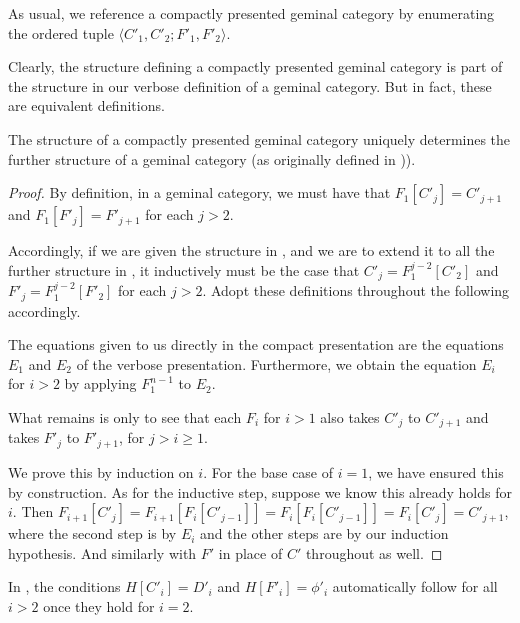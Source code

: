 As usual, we reference a compactly presented geminal category by enumerating the ordered tuple $\langle C'_1, C'_2; F'_1, F'_2 \rangle$.

Clearly, the structure defining a compactly presented geminal category is part of the structure in our verbose definition of a geminal category. But in fact, these are equivalent definitions.

\begin{theorem}\label{GeminalCompactIsVerbose}
The structure of a compactly presented geminal category uniquely determines the further structure of a geminal category (as originally defined in )).
\end{theorem}
\begin{proof}
By definition, in a geminal category, we must have that $F_1[C'_j] = C'_{j + 1}$ and $F_1[F'_j] = F'_{j + 1}$ for each $j > 2$.

Accordingly, if we are given the structure in , and we are to extend it to all the further structure in , it inductively must be the case that $C'_j = F_1^{j - 2}[C'_2]$ and $F'_j = F_1^{j - 2}[F'_2]$ for each $j > 2$. Adopt these definitions throughout the following accordingly.

The equations given to us directly in the compact presentation are the equations $E_1$ and $E_2$ of the verbose presentation. Furthermore, we obtain the equation $E_i$ for $i > 2$ by applying $F_1^{n - 1}$ to $E_2$.

What remains is only to see that each $F_i$ for $i > 1$ also takes $C'_j$ to $C'_{j + 1}$ and takes $F'_j$ to $F'_{j + 1}$, for $j > i \geq 1$.

We prove this by induction on $i$. For the base case of $i = 1$, we have ensured this by construction. As for the inductive step, suppose we know this already holds for $i$. Then $F_{i + 1}[C'_j] = F_{i + 1} [F_i [C'_{j - 1}]] = F_i [F_i [C'_{j - 1}]] = F_i [C'_j] = C'_{j + 1}$, where the second step is by $E_i$ and the other steps are by our induction hypothesis. And similarly with $F'$ in place of $C'$ throughout as well.
\end{proof}

\begin{corollary}\label{CompactGeminalCatHomoDefn}
In , the conditions $H[C'_i] = D'_i$ and $H[F'_i] = \phi'_i$ automatically follow for all $i > 2$ once they hold for $i = 2$.
\end{corollary}

